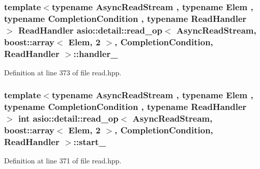 \subsubsection[{handler\+\_\+}]{\setlength{\rightskip}{0pt plus 5cm}template$<$typename Async\+Read\+Stream , typename Elem , typename Completion\+Condition , typename Read\+Handler $>$ Read\+Handler {\bf asio\+::detail\+::read\+\_\+op}$<$ Async\+Read\+Stream, {\bf boost\+::array}$<$ Elem, 2 $>$,                           Completion\+Condition, Read\+Handler $>$\+::handler\+\_\+}\label{classasio_1_1detail_1_1read__op_3_01_async_read_stream_00_01boost_1_1array_3_01_elem_00_012_01_4b92266d3d5081f809423aa72530eb694_a1fc8ad539a1d58ecd25ac32e4ad20519}


Definition at line 373 of file read.\+hpp.

\hypertarget{classasio_1_1detail_1_1read__op_3_01_async_read_stream_00_01boost_1_1array_3_01_elem_00_012_01_4b92266d3d5081f809423aa72530eb694_a41729b92e635fb507621c00b1d011395}{}
\subsubsection[{start\+\_\+}]{\setlength{\rightskip}{0pt plus 5cm}template$<$typename Async\+Read\+Stream , typename Elem , typename Completion\+Condition , typename Read\+Handler $>$ int {\bf asio\+::detail\+::read\+\_\+op}$<$ Async\+Read\+Stream, {\bf boost\+::array}$<$ Elem, 2 $>$,                           Completion\+Condition, Read\+Handler $>$\+::start\+\_\+}\label{classasio_1_1detail_1_1read__op_3_01_async_read_stream_00_01boost_1_1array_3_01_elem_00_012_01_4b92266d3d5081f809423aa72530eb694_a41729b92e635fb507621c00b1d011395}


Definition at line 371 of file read.\+hpp.

\hypertarget{classasio_1_1detail_1_1read__op_3_01_async_read_stream_00_01boost_1_1array_3_01_elem_00_012_01_4b92266d3d5081f809423aa72530eb694_ae1ff805a209a3733d72034de4653d49d}{}
